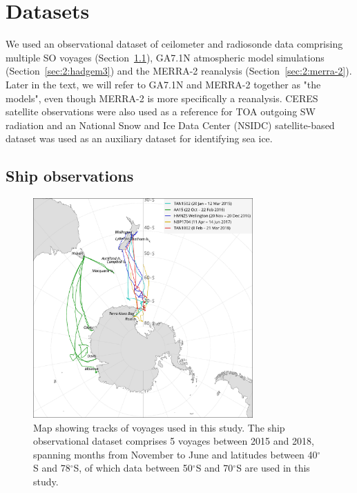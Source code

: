 \section{Datasets}
\label{sec:2:datasets}

We used an observational dataset of ceilometer and radiosonde data comprising
multiple SO voyages (Section~\ref{sec:2:ship-observations}), GA7.1N atmospheric
model simulations (Section~\ref{sec:2:hadgem3}) and the MERRA-2 reanalysis
(Section~\ref{sec:2:merra-2}). Later in the text, we will refer to GA7.1N and
MERRA-2 together as "the models", even though MERRA-2 is more specifically a
reanalysis. CERES satellite observations \citep{wielicki1996} were also used as
a reference for TOA outgoing SW radiation and an National Snow and Ice Data
Center (NSIDC) satellite-based dataset \citep{maslanik1999} was used as an
auxiliary dataset for identifying sea ice.

\subsection{Ship observations}
\label{sec:2:ship-observations}

\begin{figure}[t]
\centering
\includegraphics[width=0.75\textwidth]{chapter2/fig/map_rev2.pdf}
\caption[Map showing tracks of voyages]{
Map showing tracks of voyages used in this study. The ship observational dataset
comprises 5 voyages between 2015 and 2018, spanning months from November to June
and latitudes between 40$^\circ$S and 78$^\circ$S, of which data between
50$^\circ$S and 70$^\circ$S are used in this study.
}
\label{fig:2:map}
\end{figure}

